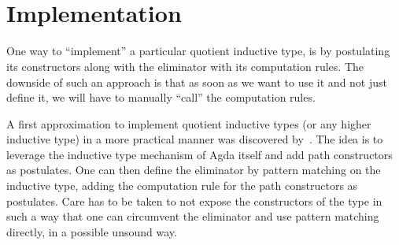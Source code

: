 \begin{sorts}
  \sortnamety{\tttmty}{(\Gamma : \ttconty) \to \tttyty\ \Gamma \to \Set}
\end{sorts}

\begin{datatype}{\tttmty}{}
   \\
   \\
\end{datatype}


\section{Implementation}

One way to ``implement'' a particular quotient inductive type, is by
postulating its constructors along with the eliminator with its
computation rules. The downside of such an approach is that as soon as
we want to use it and not just define it, we will have to manually
``call'' the computation rules.

A first approximation to implement quotient inductive types (or any
higher inductive type) in a more practical manner was discovered
by~\cite{Licata2011}. The idea is to leverage the inductive type
mechanism of Agda itself and add path constructors as postulates. One
can then define the eliminator by pattern matching on the inductive
type, adding the computation rule for the path constructors as
postulates. Care has to be taken to not expose the constructors of the
type in such a way that one can circumvent the eliminator and use
pattern matching directly, in a possible unsound way.

